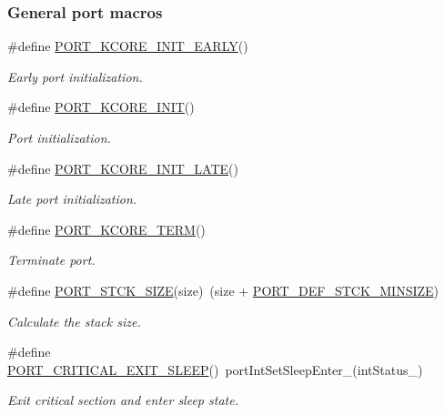 \subsubsection*{General port macros}
\begin{DoxyCompactItemize}
\item 
\#define \hyperlink{group__template__cpu__intf_gabf0ea7d36355a7133ee9e9f8abafa6ff}{P\-O\-R\-T\-\_\-\-K\-C\-O\-R\-E\-\_\-\-I\-N\-I\-T\-\_\-\-E\-A\-R\-L\-Y}()
\begin{DoxyCompactList}\small\item\em Early port initialization. \end{DoxyCompactList}\item 
\#define \hyperlink{group__template__cpu__intf_ga682a913f5439544d4f0ee14ae68507fd}{P\-O\-R\-T\-\_\-\-K\-C\-O\-R\-E\-\_\-\-I\-N\-I\-T}()
\begin{DoxyCompactList}\small\item\em Port initialization. \end{DoxyCompactList}\item 
\#define \hyperlink{group__template__cpu__intf_ga5c133105168261f1744abf3c5917a515}{P\-O\-R\-T\-\_\-\-K\-C\-O\-R\-E\-\_\-\-I\-N\-I\-T\-\_\-\-L\-A\-T\-E}()
\begin{DoxyCompactList}\small\item\em Late port initialization. \end{DoxyCompactList}\item 
\#define \hyperlink{group__template__cpu__intf_gac386e206a8b5225c9aa56be88b625837}{P\-O\-R\-T\-\_\-\-K\-C\-O\-R\-E\-\_\-\-T\-E\-R\-M}()
\begin{DoxyCompactList}\small\item\em Terminate port. \end{DoxyCompactList}\item 
\#define \hyperlink{group__template__cpu__intf_gacb3a46e89d327fbaf5c122fe23877b24}{P\-O\-R\-T\-\_\-\-S\-T\-C\-K\-\_\-\-S\-I\-Z\-E}(size)~(size + \hyperlink{group__template__cpu__intf_ga5a629fee11006b5b0b97f7cb7176efd4}{P\-O\-R\-T\-\_\-\-D\-E\-F\-\_\-\-S\-T\-C\-K\-\_\-\-M\-I\-N\-S\-I\-Z\-E})
\begin{DoxyCompactList}\small\item\em Calculate the stack size. \end{DoxyCompactList}\item 
\#define \hyperlink{group__template__cpu__intf_gad699a79233d442ae90a69c113e314542}{P\-O\-R\-T\-\_\-\-C\-R\-I\-T\-I\-C\-A\-L\-\_\-\-E\-X\-I\-T\-\_\-\-S\-L\-E\-E\-P}()~port\-Int\-Set\-Sleep\-Enter\-\_\-(int\-Status\-\_\-)
\begin{DoxyCompactList}\small\item\em Exit critical section and enter sleep state. \end{DoxyCompactList}\end{DoxyCompactItemize}


